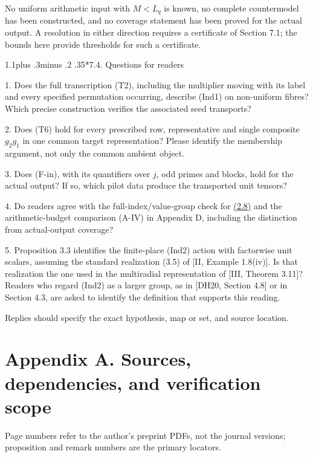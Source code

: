 \documentclass[11pt,a4paper]{amsart}
\makeatletter
\renewcommand\subsection{\@startsection{subsection}{2}{\z@}
{1.1\baselineskip plus .3\baselineskip minus .2\baselineskip}
{.35\baselineskip}{\normalfont\bfseries}}
\makeatother
\begin{document}
No uniform arithmetic input with $M<L_q$ is known, no complete countermodel has been constructed, and no coverage statement has been proved for the actual output. A resolution in either direction requires a certificate of Section 7.1; the bounds here provide thresholds for such a certificate.


\subsection*{7.4. Questions for readers}

1. Does the full transcription (T2), including the multiplier moving with its label and every specified permutation occurring, describe (Ind1) on non-uniform fibres? Which precise construction verifies the associated seed transports?


2. Does (T6) hold for every prescribed row, representative and single composite $g_2g_1$ in one common target representation? Please identify the membership argument, not only the common ambient object.


3. Does (F-in), with its quantifiers over $j$, odd primes and blocks, hold for the actual output? If so, which pilot data produce the transported unit tensors?


4. Do readers agree with the full-index/value-group check for \hyperref[eq:2.8]{(2.8)} and the arithmetic-budget comparison (A-IV) in Appendix D, including the distinction from actual-output coverage?


5. Proposition 3.3 identifies the finite-place (Ind2) action with factorwise unit scalars, assuming the standard realization (3.5) of [II, Example 1.8(iv)]. Is that realization the one used in the multiradial representation of [III, Theorem 3.11]? Readers who regard (Ind2) as a larger group, as in [DH20, Section 4.8] or in Section 4.3, are asked to identify the definition that supports this reading.


Replies should specify the exact hypothesis, map or set, and source location.


\section*{Appendix A. Sources, dependencies, and verification scope}

Page numbers refer to the author's preprint PDFs, not the journal versions; proposition and remark numbers are the primary locators.
\end{document}
